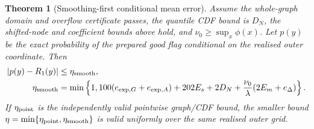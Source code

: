 \documentclass[11pt]{article}
\newtheorem{theorem}{Theorem}
\begin{document}
\begin{theorem}[Smoothing-first conditional mean error]
\label{thm:raw-smoothing-first}
Assume the whole-graph domain and overflow certificate passes, the
quantile CDF bound is $D_N$, the shifted-node and coefficient bounds above
hold, and $\nu_0\geq\sup_x\phi(x)$. Let $p(y)$ be the exact probability
of the prepared good flag conditional on the realised outer coordinate.
Then
\begin{align}
 |p(y)-R_1(y)|
 &\leq\eta_{\rm smooth},\\
 \eta_{\rm smooth}
 &=\min\left\{1,
     100(e_{\exp,G}+e_{\exp,A})+202E_s+2D_N
     +\frac{\nu_0}{\lambda}(2E_m+e_\Delta)\right\}.
\end{align}
If $\eta_{\rm point}$ is the independently valid pointwise graph/CDF
bound, the smaller bound
$\eta=\min\{\eta_{\rm point},\eta_{\rm smooth}\}$ is valid uniformly
over the same realised outer grid.
\end{theorem}
\end{document}
